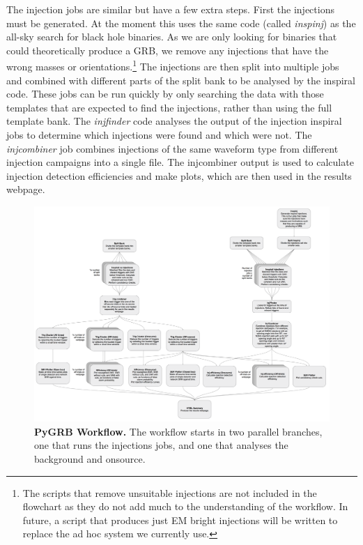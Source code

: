 \documentclass[11pt]{cuthesis}
\begin{document}
The injection jobs are similar but have a few extra steps. First the injections must be generated. At the moment this uses the same code (called \textit{inspinj}) as the all-sky search for black hole binaries. As we are only looking for binaries that could theoretically produce a GRB, we remove any injections that have the wrong masses or orientations.\footnote{The scripts that remove unsuitable injections are not included in the flowchart as they do not add much to the understanding of the workflow. In future, a script that produces just EM bright injections will be written to replace the ad hoc system we currently use.} The injections are then split into multiple jobs and combined with different parts of the split bank to be analysed by the inspiral code. These jobs can be run quickly by only searching the data with those templates that are expected to find the injections, rather than using the full template bank. The \textit{injfinder} code analyses the output of the injection inspiral jobs to determine which injections were found and which were not. The \textit{injcombiner} job combines injections of the same waveform type from different injection campaigns into a single file. The injcombiner output is used to calculate injection detection efficiencies and make plots, which are then used in the results webpage. 

\begin{figure} %
\begin{center}
\includegraphics[width=1.0\linewidth]{pygrb_flowchart.png}
\end{center}
\caption{\textbf{PyGRB Workflow.} The workflow starts in two parallel branches, one that runs the injections jobs, and one that analyses the background and onsource. }
\label{fig:pygrb flowchart}
\end{figure}
\end{document}
